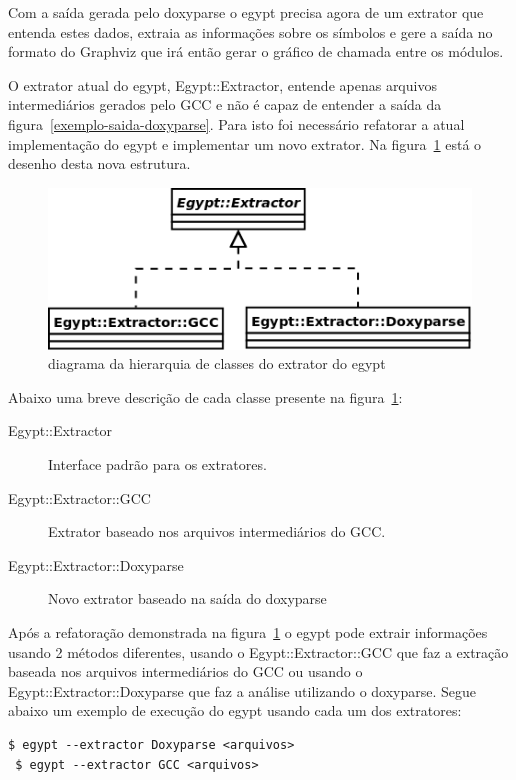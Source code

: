 Com a saída gerada pelo doxyparse o egypt precisa agora de um extrator que
entenda estes dados, extraia as informações sobre os símbolos e gere a saída no
formato do Graphviz que irá então gerar o gráfico de chamada entre os módulos.

O extrator atual do egypt, Egypt::Extractor, entende apenas arquivos
intermediários gerados pelo GCC e não é capaz de entender a saída da
figura~\ref{exemplo-saida-doxyparse}. Para isto foi necessário refatorar a
atual implementação do egypt e implementar um novo extrator. Na
figura~\ref{egypt-diagram-extractor} está o desenho desta nova estrutura.

\begin{figure}[h]
\center
\includegraphics[scale=0.4]{imagens/egypt-diagram-extractor}
\caption{diagrama da hierarquia de classes do extrator do egypt}
\label{egypt-diagram-extractor}
\end{figure}

Abaixo uma breve descrição de cada classe presente na
figura~\ref{egypt-diagram-extractor}:

\begin{description}
\item[Egypt::Extractor] Interface padrão para os extratores.
\item[Egypt::Extractor::GCC] Extrator baseado nos arquivos intermediários do GCC.
\item[Egypt::Extractor::Doxyparse] Novo extrator baseado na saída do doxyparse
\end{description}

Após a refatoração demonstrada na figura~\ref{egypt-diagram-extractor} o egypt
pode extrair informações usando 2 métodos diferentes, usando o
Egypt::Extractor::GCC que faz a extração baseada nos arquivos intermediários do
GCC ou usando o Egypt::Extractor::Doxyparse que faz a análise utilizando o
doxyparse. Segue abaixo um exemplo de execução do egypt usando cada um dos
extratores:

\begin{Verbatim}[frame=single,fontsize=\relsize{-2},fontfamily=courier]
 $ egypt --extractor Doxyparse <arquivos>
 $ egypt --extractor GCC <arquivos>
\end{Verbatim}

